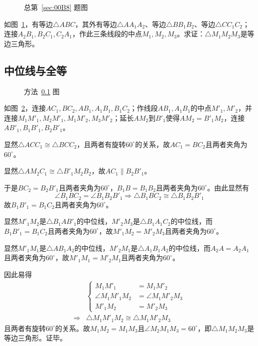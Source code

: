 

\begin{figure}[htbp]
  \centering {}
  \caption{总第~\ref{sec:00B8} 题图}
  \label{fig:00B8}
\end{figure}

如图~\ref{fig:00B8}，有等边$\triangle ABC$，其外有等边$\triangle AA_1A_2$、等边$\triangle BB_1B_2$、等边$\triangle CC_1C_2$；连接$A_2B_1, B_2C_1, C_2A_1$，作此三条线段的中点$M_1, M_2, M_3$。求证：$\triangle M_1M_2M_3$是等边三角形。

\subsection{中位线与全等} \label{subsec:00B8-meq}

\begin{figure}[htbp]
  \centering {}
  \caption{方法~\ref{subsec:00B8-meq} 图}
  \label{fig:00B8-meq}
\end{figure}

如图~\ref{fig:00B8-meq}，连接$AC_1, BC_2, AB_1, A_1B_1, B_1C_2$；作线段$AB_1, A_1B_1$的中点$M'_1, M'_2$，并连接$M_1M'_1, M_2M'_1, M_1M'_2, M_3M'_2$；延长$AM_2$到$B'_1$使得$AM_2 = B'_1M_2$，连接$AB'_1, B_1B'_1, B_2B'_1$。

显然$\triangle ACC_1 \cong \triangle BCC_2$，且两者有旋转$60^\circ$的关系，故$AC_1 = BC_2$且两者夹角为$60^\circ$。

显然$\triangle AM_2C_1 \cong \triangle B'_1M_2B_2$，故$AC_1 \parallel B_2B'_1$。

于是$BC_2 = B_2B'_1$且两者夹角为$60^\circ$，$B_1B = B_1B_2$且两者夹角为$60^\circ$。由此显然有
\[ \angle B_1BC_2 = \angle B_1B_2B'_1 \Rightarrow \triangle B_1BC_2 \cong \triangle B_1B_2B'_1 \]
故$B_1B'_1 = B_1C_2$且两者夹角为$60^\circ$。

显然$M'_1M_2$是$\triangle B_1AB'_1$的中位线，$M'_2M_3$是$\triangle B_1A_1C_2$的中位线，而$B_1B'_1 = B_1C_2$且两者夹角为$60^\circ$，故$M'_1M_2 = M'_2M_3$且两者夹角为$60^\circ$。

显然$M'_1M_1$是$\triangle AB_1A_2$的中位线，$M'_2M_1$是$\triangle A_1B_1A_2$的中位线，而$A_2A = A_2A_1$且两者夹角为$60^\circ$，故$M'_1M_1 = M'_2M_1$且两者夹角为$60^\circ$。

因此易得
\begin{align*}
  & \left\{ \begin{aligned}
    M_1M'_1 &= M_1M'_2 \\
    \angle M_1M'_1M_2 &= \angle M_1M'_2M_3 \\
    M'_1M_2 &= M'_2M_3
  \end{aligned} \right. \\
  \Rightarrow{}& \triangle M_1M'_1M_2 \cong \triangle M_1M'_2M_3
\end{align*}
且两者有旋转$60^\circ$的关系。故$M_1M_2 = M_1M_3$且$\angle M_2M_1M_3 = 60^\circ$，即$\triangle M_1M_2M_3$是等边三角形。证毕。

